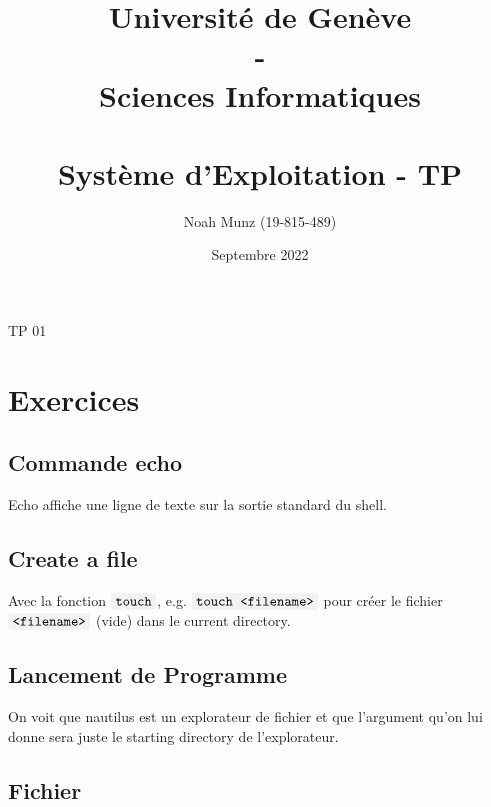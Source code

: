 \documentclass[french]{article}
\title{
   {\huge Université de Genève \\ - \\ Sciences Informatiques} \\
    \vspace{0.6cm}
    \unilogo{0.38} \\ 
    \vspace{1.1cm}
    {\huge Système d'Exploitation - TP \nb}
    \vspace{0.1cm}
}
\author{Noah Munz (19-815-489)}
\date{Septembre 2022}
\newcommand{\code}[1]{$\mbox{\colorbox{light-gray}{\texttt{#1}}}$}
\newcommand{\nb}{01}
\begin{document}
%
\maketitle
\vspace{1.3cm}
\tableofcontents
\thispagestyle{empty}
\clearpage
\setcounter{page}{1}
%
%
\begin{center}
{\huge TP \nb}
\end{center}
\vspace{0.3cm}
%


%
\section{Exercices}
%
\vspace{0.5cm}
%
%
\subsection{Commande echo}
Echo affiche une ligne de texte sur la sortie standard du shell.
%
\subsection{Create a file}
Avec la fonction \code{touch}, e.g. \code{touch <filename>} pour créer le fichier \code{<filename>} (vide) dans le current directory.

\subsection{Lancement de Programme}
On voit que nautilus est un explorateur de fichier et que l'argument qu'on lui donne sera juste le starting directory de l'explorateur.

\subsection{Fichier}
\vspace{0.2cm}
\end{document}
